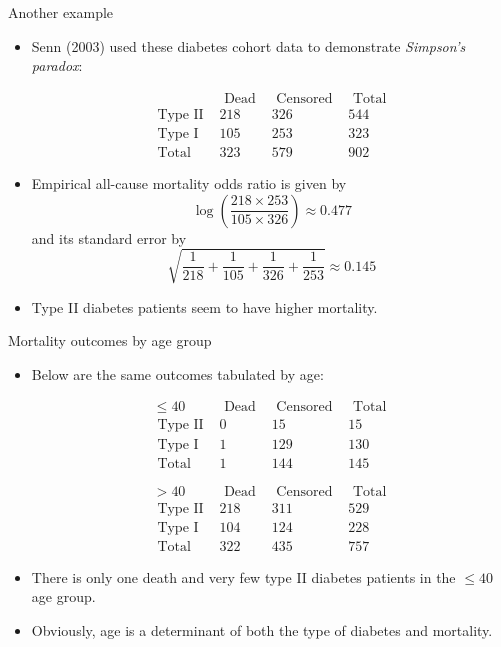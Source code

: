 \documentclass[10pt,handout]{beamer}\usepackage[]{graphicx}\usepackage[]{color}
\begin{document}
\begin{frame}{Another example}
	\begin{itemize}
		\item Senn (2003) used these diabetes cohort data to
		demonstrate \textit{Simpson's paradox}:
		
		$$
		\begin{array}{lccc} 
			& \text { Dead } & \text { Censored } & \text { Total } \\
			\text { Type II } & 218 & 326 & 544 \\
			\text { Type I } & 105 & 253 & 323 \\
			\text { Total } & 323 & 579 & 902
		\end{array}
		$$
		
		\item Empirical all-cause mortality odds ratio is given by
		$$
		\log \left(\frac{218 \times 253}{105 \times 326}\right) \approx 0.477
		$$
		and its standard error by
		$$
		\sqrt{\frac{1}{218}+\frac{1}{105}+\frac{1}{326}+\frac{1}{253}} \approx 0.145
		$$
		\item Type II diabetes patients seem to have higher mortality.
	
	
	\end{itemize}
\end{frame}



\begin{frame}{Mortality outcomes by age group}
	\begin{itemize}
		\item Below are the same outcomes tabulated by age:
		
		$$
		\begin{array}{lccc}
		\leq 40 & \text { Dead } & \text { Censored } & \text { Total } \\
		\text { Type II } & 0 & 15 & 15 \\
		\text { Type I } & 1 & 129 & 130 \\
		\text { Total } & 1 & 144 & 145 \\
		& & & \\
		& & & \\
		>40 & \text { Dead } & \text { Censored } & \text { Total } \\
		\text { Type II } & 218 & 311 & 529 \\
		\text { Type I } & 104 & 124 & 228 \\
		\text { Total } & 322 & 435 & 757
		\end{array}
		$$
		\item There is only one death and very few type II diabetes patients in the $\leq 40$ age group.
		\item Obviously, age is a determinant of both the type of diabetes and mortality.
	\end{itemize}
\end{frame}
\end{document}
